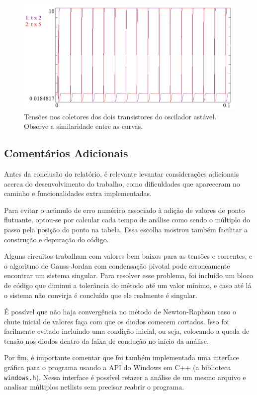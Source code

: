 \documentclass[11pt,titlepage]{article}
\begin{document}
\begin{figure}[!ht]
\centering
\includegraphics[scale=0.5]{graficos/astavelnpn.png}
\caption{Tensões nos coletores dos dois transistores do oscilador astável. Observe a similaridade entre as curvas.}
\end{figure}



\subsection{Comentários Adicionais}

Antes da conclusão do relatório, é relevante levantar considerações adicionais acerca do desenvolvimento do trabalho, como dificuldades que apareceram no caminho e funcionalidades extra implementadas.

Para evitar o acúmulo de erro numérico associado à adição de valores de ponto flutuante, optou-se por calcular cada tempo de análise como sendo o múltiplo do passo pela posição do ponto na tabela. Essa escolha mostrou também facilitar a construção e depuração do código.

Alguns circuitos trabalham com valores bem baixos para as tensões e correntes, e o algoritmo de Gauss-Jordan com condensação pivotal pode erroneamente encontrar um sistema singular. Para resolver esse problema, foi incluído um bloco de código que diminui a tolerância do método até um valor mínimo, e caso até lá o sistema não convirja é concluído que ele realmente é singular.

É possível que não haja convergência no método de Newton-Raphson caso o chute inicial de valores faça com que os diodos comecem cortados. Isso foi facilmente evitado incluindo uma condição inicial, ou seja, colocando a queda de tensão nos diodos dentro da faixa de condução no início da análise.

Por fim, é importante comentar que foi também implementada uma interface gráfica para o programa usando a API do Windows em C++ (a biblioteca \texttt{windows.h}). Nessa interface é possível refazer a análise de um mesmo arquivo e analisar múltiplos netlists sem precisar reabrir o programa.
\end{document}
